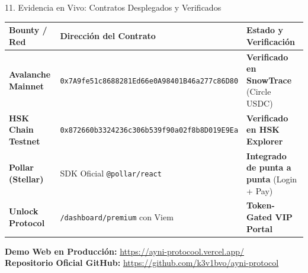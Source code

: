 \documentclass[10pt,aspectratio=169]{beamer}
\begin{document}
\begin{frame}{11. Evidencia en Vivo: Contratos Desplegados y Verificados}
  \begin{center}
    \small
    \begin{tabular}{lll}
      \toprule
      \textbf{Bounty / Red} & \textbf{Dirección del Contrato} & \textbf{Estado y Verificación} \\
      \midrule
      \textbf{Avalanche Mainnet} & \texttt{0x7A9fe51c8688281Ed66e0A98401B46a277c86D80} & \textcolor{AyniGreen}{\textbf{Verificado en SnowTrace}} (Circle USDC) \\
      \textbf{HSK Chain Testnet} & \texttt{0x872660b3324236c306b539f90a02f8b8D019E9Ea} & \textcolor{AyniGreen}{\textbf{Verificado en HSK Explorer}} \\
      \textbf{Pollar (Stellar)} & SDK Oficial \texttt{@pollar/react} & \textcolor{AyniGreen}{\textbf{Integrado de punta a punta}} (Login + Pay) \\
      \textbf{Unlock Protocol} & \texttt{/dashboard/premium} con Viem & \textcolor{AyniGreen}{\textbf{Token-Gated VIP Portal}} \\
      \bottomrule
    \end{tabular}
  \end{center}
  \vspace{0.4cm}
  \begin{center}
    \textbf{Demo Web en Producción:} \href{https://ayni-protocool.vercel.app/}{\textcolor{AyniCyan}{\underline{https://ayni-protocool.vercel.app/}}}\\
    \textbf{Repositorio Oficial GitHub:} \href{https://github.com/k3v1bvo/ayni-protocol}{\textcolor{AyniNavy}{\underline{https://github.com/k3v1bvo/ayni-protocol}}}
  \end{center}
\end{frame}
\end{document}
